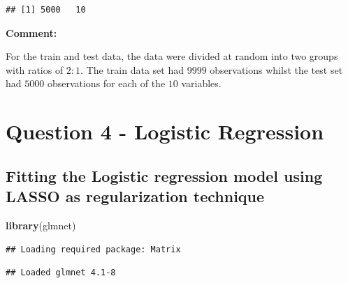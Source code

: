 \documentclass[
  11pt,
]{article}
\newenvironment{Shaded}{\begin{snugshade}}{\end{snugshade}}
\newcommand{\AttributeTok}[1]{\textcolor[rgb]{0.13,0.29,0.53}{#1}}
\newcommand{\DecValTok}[1]{\textcolor[rgb]{0.00,0.00,0.81}{#1}}
\newcommand{\FloatTok}[1]{\textcolor[rgb]{0.00,0.00,0.81}{#1}}
\newcommand{\FunctionTok}[1]{\textcolor[rgb]{0.13,0.29,0.53}{\textbf{#1}}}
\newcommand{\NormalTok}[1]{#1}
\newcommand{\OtherTok}[1]{\textcolor[rgb]{0.56,0.35,0.01}{#1}}
\newcommand{\SpecialCharTok}[1]{\textcolor[rgb]{0.81,0.36,0.00}{\textbf{#1}}}
\newcommand{\StringTok}[1]{\textcolor[rgb]{0.31,0.60,0.02}{#1}}
\begin{document}
\begin{verbatim}
## [1] 5000   10
\end{verbatim}

\hfill\break
\textbf{Comment:}

For the train and test data, the data were divided at random into two
groups with ratios of \(2:1\). The train data set had \(9999\)
observations whilst the test set had \(5000\) observations for each of
the \(10\) variables.

\section{Question 4 - Logistic Regression}
\subsection{Fitting the Logistic regression model using LASSO as regularization technique}

\begin{Shaded}
\begin{Highlighting}[]
\FunctionTok{library}\NormalTok{(glmnet)}
\end{Highlighting}
\end{Shaded}

\begin{verbatim}
## Loading required package: Matrix
\end{verbatim}

\begin{verbatim}
## Loaded glmnet 4.1-8
\end{verbatim}

\begin{Shaded}
\end{Shaded}
\end{document}
